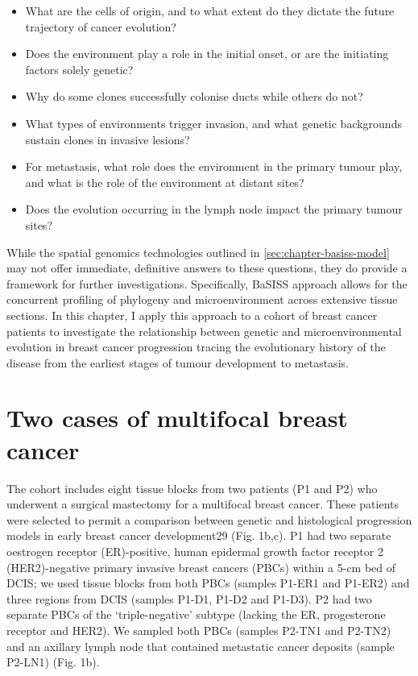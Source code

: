 \begin{itemize}
    \item What are the cells of origin, and to what extent do they dictate the future trajectory of cancer evolution?
    \item Does the environment play a role in the initial onset, or are the initiating factors solely genetic?
    \item Why do some clones successfully colonise ducts while others do not?
    \item What types of environments trigger invasion, and what genetic backgrounds sustain clones in invasive lesions?
    \item For metastasis, what role does the environment in the primary tumour play, and what is the role of the environment at distant sites?
    \item Does the evolution occurring in the lymph node impact the primary tumour sites?
\end{itemize}

While the spatial genomics technologies outlined in \cref{sec:chapter-basiss-model} may not offer immediate, definitive answers to these questions, they do provide a framework for further investigations. Specifically, \ac{BaSISS} approach allows for the concurrent profiling of phylogeny and microenvironment across extensive tissue sections. In this chapter, I apply this approach to a cohort of breast cancer patients to investigate the relationship between genetic and microenvironmental evolution in breast cancer progression tracing the evolutionary history of the disease from the earliest stages of tumour development to metastasis.

\section{Two cases of multifocal breast cancer}

The cohort includes eight tissue blocks from two patients (P1 and P2) who underwent a surgical mastectomy for a multifocal breast cancer. These patients were selected to permit a comparison between genetic and histological progression models in early breast cancer development29 (Fig. 1b,c). P1 had two separate oestrogen receptor (ER)-positive, human epidermal growth factor receptor 2 (HER2)-negative primary invasive breast cancers (PBCs) within a 5-cm bed of DCIS; we used tissue blocks from both PBCs (samples P1-ER1 and P1-ER2) and three regions from DCIS (samples P1-D1, P1-D2 and P1-D3). P2 had two separate PBCs of the ‘triple-negative’ subtype (lacking the ER, progesterone receptor and HER2). We sampled both PBCs (samples P2-TN1 and P2-TN2) and an axillary lymph node that contained metastatic cancer deposits (sample P2-LN1) (Fig. 1b).

